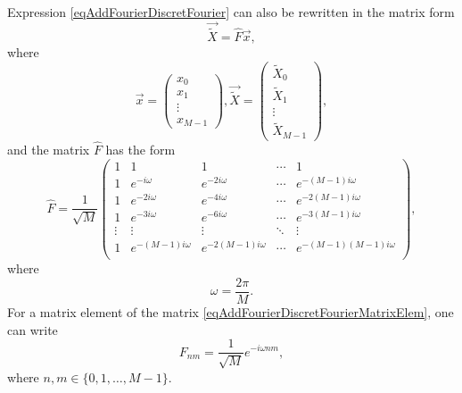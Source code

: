 Expression \eqref{eqAddFourierDiscretFourier} can also be
rewritten in the matrix form
\begin{equation}
\vec{\tilde{X}} = \hat{F} \vec{x},
\nonumber
\end{equation}
where
\begin{equation}
\vec{x} = 
\left(
\begin{array}{c}
x_0 \\
x_1 \\
\vdots \\
x_{M-1}
\end{array}
\right)
,
\vec{\tilde{X}} = 
\left(
\begin{array}{c}
\tilde{X}_0 \\
\tilde{X}_1 \\
\vdots \\
\tilde{X}_{M-1}
\end{array}
\right)
,
\nonumber
\end{equation}
and the matrix $\hat{F}$ has the form
\begin{equation}
\hat{F} = 
\frac{1}{\sqrt{M}}
\begin{pmatrix}
1 & 1 & 1 & \cdots & 1 \\
1 & e^{-i \omega} & e^{-2 i \omega} & \cdots & 
e^{-\left( M - 1 \right) i \omega} \\
1 & e^{-2 i \omega} & e^{-4 i \omega} & \cdots & 
e^{-2 \left( M - 1 \right) i \omega} \\
1 & e^{-3 i \omega} & e^{-6 i \omega} & \cdots & 
e^{-3 \left( M - 1 \right) i \omega} \\
\vdots & \vdots & \vdots & \ddots & \vdots \\
1 & e^{-\left( M - 1 \right) i \omega} & e^{-2\left( M - 1 \right) i \omega} & \cdots & 
e^{- \left( M - 1 \right)\left( M - 1 \right) i \omega} \\
\end{pmatrix}
,
\label{eqAddFourierDiscretFourierMatrixElem}
\end{equation}
where
\[
\omega = \frac{2 \pi}{M}.
\]
For a matrix element of the matrix
\eqref{eqAddFourierDiscretFourierMatrixElem}, one can write
\begin{equation}
F_{n m} = \frac{1}{\sqrt{M}}e^{-i \omega n m},
\label{eqAddFourierDiscretFourierMatrixElem2}
\end{equation}
where $n, m \in \{ 0, 1, \dots, M - 1\}$.
